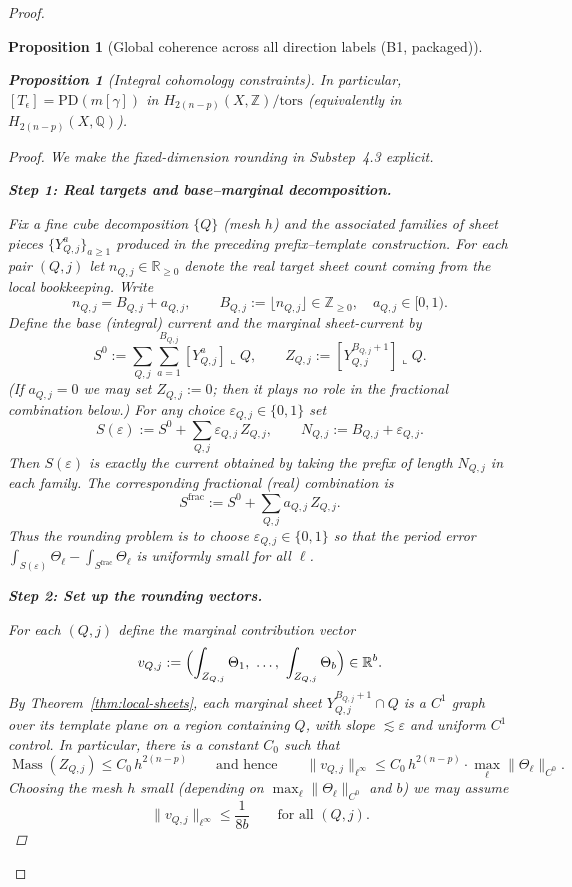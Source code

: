 \documentclass[11pt]{article}
\numberwithin{equation}{section}  %
\theoremstyle{plain}
\newtheorem{proposition}[theorem]{Proposition}
\theoremstyle{definition}
\theoremstyle{remark}
\newcommand{\R}{\mathbb{R}}
\newcommand{\Z}{\mathbb{Z}}
\newcommand{\Q}{\mathbb{Q}}
\DeclareMathOperator{\Mass}{Mass}
\begin{document}
\begin{proof}
\begin{proposition}[Global coherence across all direction labels (B1, packaged)]
\begin{enumerate}
\begin{proposition}[Integral cohomology constraints]
In particular, $[T_\epsilon]=\mathrm{PD}(m[\gamma])$ in $H_{2(n-p)}(X,\Z)/\mathrm{tors}$ (equivalently in $H_{2(n-p)}(X,\Q)$).
\end{proposition}

\begin{proof}
We make the fixed-dimension rounding in Substep~4.3 explicit.

\smallskip\noindent
\textbf{Step 1: Real targets and base--marginal decomposition.}

Fix a fine cube decomposition $\{Q\}$ (mesh $h$) and the associated families of sheet pieces
$\{Y_{Q,j}^a\}_{a\ge 1}$ produced in the preceding prefix--template construction.
For each pair $(Q,j)$ let $n_{Q,j}\in\R_{\ge 0}$ denote the \emph{real} target sheet count coming from the local bookkeeping.
Write
\[
n_{Q,j}=B_{Q,j}+a_{Q,j},\qquad  B_{Q,j}:=\lfloor n_{Q,j}\rfloor\in\Z_{\ge 0},\quad a_{Q,j}\in[0,1).
\]
Define the \emph{base} (integral) current and the \emph{marginal} sheet-current by
\[
S^{0}:=\sum_{Q,j}\sum_{a=1}^{B_{Q,j}}[Y_{Q,j}^a]\llcorner Q,
\qquad
Z_{Q,j}:=[Y_{Q,j}^{B_{Q,j}+1}]\llcorner Q.
\]
(If $a_{Q,j}=0$ we may set $Z_{Q,j}:=0$; then it plays no role in the fractional combination below.)
For any choice $\varepsilon_{Q,j}\in\{0,1\}$ set
\[
S(\varepsilon):=S^{0}+\sum_{Q,j}\varepsilon_{Q,j}\,Z_{Q,j},
\qquad
N_{Q,j}:=B_{Q,j}+\varepsilon_{Q,j}.
\]
Then $S(\varepsilon)$ is exactly the current obtained by taking the prefix of length $N_{Q,j}$ in each family.
The corresponding \emph{fractional} (real) combination is
\[
S^{\mathrm{frac}}:=S^{0}+\sum_{Q,j}a_{Q,j}\,Z_{Q,j}.
\]
Thus the rounding problem is to choose $\varepsilon_{Q,j}\in\{0,1\}$ so that the period error
$\int_{S(\varepsilon)}\Theta_\ell-\int_{S^{\mathrm{frac}}}\Theta_\ell$ is uniformly small for all $\ell$.


\smallskip\noindent
\textbf{Step 2: Set up the rounding vectors.}

For each $(Q,j)$ define the \emph{marginal contribution vector}
\[
v_{Q,j}:=\Bigl(\int_{Z_{Q,j}}\Theta_1,\ \dots,\ \int_{Z_{Q,j}}\Theta_b\Bigr)\in\R^b.
\]
By Theorem~\ref{thm:local-sheets}, each marginal sheet $Y_{Q,j}^{B_{Q,j}+1}\cap Q$ is a $C^1$ graph over its template plane on a region containing $Q$,
with slope $\lesssim \varepsilon$ and uniform $C^1$ control. In particular, there is a constant $C_0$ such that
\[
\Mass(Z_{Q,j})\le C_0\,h^{2(n-p)}
\qquad\text{and hence}\qquad
\|v_{Q,j}\|_{\ell^\infty}\le C_0\,h^{2(n-p)}\cdot \max_{\ell}\|\Theta_\ell\|_{C^0}.
\]
Choosing the mesh $h$ small (depending on $\max_\ell\|\Theta_\ell\|_{C^0}$ and $b$) we may assume
\[
\|v_{Q,j}\|_{\ell^\infty}\le \frac{1}{8b}\qquad\text{for all }(Q,j).
\]



\end{proof}
\end{enumerate}
\end{proposition}
\end{proof}
\end{document}
